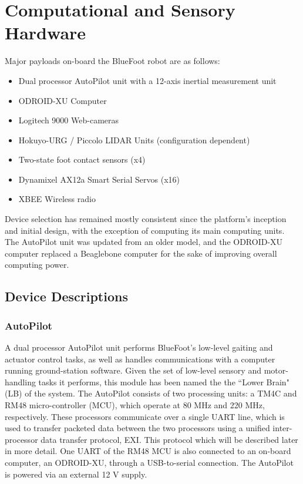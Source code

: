 	\section{Computational and Sensory Hardware}
		
		\noindent
		Major payloads on-board the BlueFoot robot are as follows: 

			\begin{itemize}
				\item{Dual processor AutoPilot unit with a 12-axis inertial measurement unit}
				\item{ODROID-XU Computer}
				\item{Logitech 9000 Web-cameras}
				\item{Hokuyo-URG / Piccolo LIDAR Units (configuration dependent)}
				\item{Two-state foot contact sensors (x4)}
				\item{Dynamixel AX12a Smart Serial Servos (x16)}
				\item{XBEE Wireless radio}
			\end{itemize}

		Device selection has remained mostly consistent since the platform's inception and initial design, with the exception of computing its main computing units. The AutoPilot unit was updated from an older model, and the ODROID-XU computer replaced a Beaglebone computer for the sake of improving overall computing power.

		\subsection{Device Descriptions}
	
			\subsubsection{AutoPilot}

				A dual processor AutoPilot unit performs BlueFoot's low-level gaiting and actuator control tasks, as well as handles communications with a computer running ground-station software. Given the set of low-level sensory and motor-handling tasks it performs, this module has been named the the ``Lower Brain" (LB) of the system. The AutoPilot consists of two processing units: a TM4C and RM48 micro-controller (MCU), which operate at 80 MHz and 220 MHz, respectively. These processors communicate over a single UART line, which is used to transfer packeted data between the two processors using a unified inter-processor data transfer protocol, EXI. This protocol which will be described later in more detail. One UART of the RM48 MCU is also connected to an on-board computer, an ODROID-XU, through a USB-to-serial connection. The AutoPilot is powered via an external 12 V supply.
	
